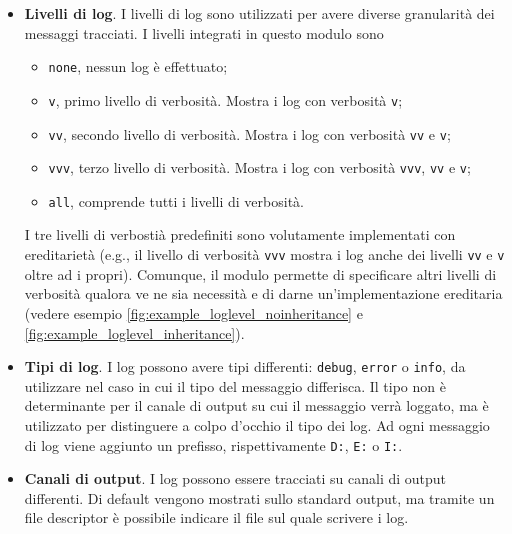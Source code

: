 \documentclass[12pt,a4paper,openright]{book} %
\begin{document}
\begin{itemize}
	\item \textbf{Livelli di log}. I livelli di log sono
          utilizzati per avere diverse granularità dei messaggi
          tracciati. I livelli integrati in questo modulo sono
	\begin{itemize}
		\item \texttt{none}, nessun log è effettuato;
		\item \texttt{v}, primo livello di verbosità. Mostra i
                  log con verbosità \texttt{v};
		\item \texttt{vv}, secondo livello di
                  verbosità. Mostra i log con verbosità \texttt{vv} e
                  \texttt{v};
		\item \texttt{vvv}, terzo livello di verbosità. Mostra
                  i log con verbosità \texttt{vvv}, \texttt{vv} e
                  \texttt{v};
		\item \texttt{all}, comprende tutti i livelli di
                  verbosità.
	\end{itemize}
	I tre livelli di verbostià predefiniti sono volutamente
        implementati con ereditarietà (e.g., il livello di verbosità
        \texttt{vvv} mostra i log anche dei livelli \texttt{vv} e
        \texttt{v} oltre ad i propri). Comunque, il modulo permette di
        specificare altri livelli di verbosità qualora ve ne sia
        necessità e di darne un'implementazione ereditaria (vedere
        esempio \ref{fig:example_loglevel_noinheritance} e
        \ref{fig:example_loglevel_inheritance}).

	\item \textbf{Tipi di log}. I log possono avere tipi
          differenti: \texttt{debug}, \texttt{error} o \texttt{info},
          da utilizzare nel caso in cui il tipo del messaggio
          differisca. Il tipo non è determinante per il canale di
          output su cui il messaggio verrà loggato, ma è utilizzato
          per distinguere a colpo d'occhio il tipo dei log. Ad ogni
          messaggio di log viene aggiunto un prefisso, rispettivamente
          \texttt{D:}, \texttt{E:} o \texttt{I:}.

	\item \textbf{Canali di output}. I log possono essere
          tracciati su canali di output differenti. Di default vengono
          mostrati sullo standard output, ma tramite un file
          descriptor è possibile indicare il file sul quale scrivere i
          log.
\end{itemize}
\end{document}
